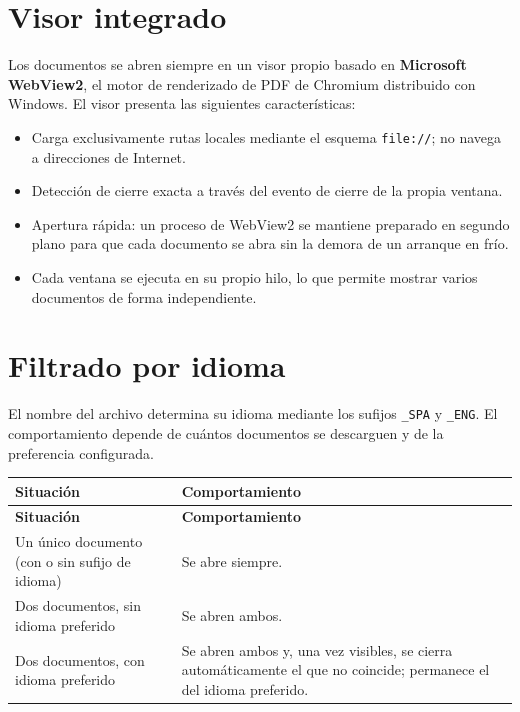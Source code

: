 \documentclass[11pt,a4paper]{article}
\begin{document}
\section{Visor integrado}
Los documentos se abren siempre en un visor propio basado en \textbf{Microsoft
WebView2}, el motor de renderizado de PDF de Chromium distribuido con Windows.
El visor presenta las siguientes características:

\begin{itemize}[leftmargin=1.4em,itemsep=2pt]
  \item Carga exclusivamente rutas locales mediante el esquema \texttt{file://};
        no navega a direcciones de Internet.
  \item Detección de cierre exacta a través del evento de cierre de la propia
        ventana.
  \item Apertura rápida: un proceso de WebView2 se mantiene preparado en segundo
        plano para que cada documento se abra sin la demora de un arranque en
        frío.
  \item Cada ventana se ejecuta en su propio hilo, lo que permite mostrar varios
        documentos de forma independiente.
\end{itemize}

\section{Filtrado por idioma}
El nombre del archivo determina su idioma mediante los sufijos \texttt{\_SPA} y
\texttt{\_ENG}. El comportamiento depende de cuántos documentos se descarguen y
de la preferencia configurada.

\begin{xltabular}{\textwidth}{@{} L L @{}}
\toprule
\textbf{Situación} & \textbf{Comportamiento} \\
\midrule
\endfirsthead
\toprule
\textbf{Situación} & \textbf{Comportamiento} \\
\midrule
\endhead
\bottomrule
\endfoot
Un único documento (con o sin sufijo de idioma) & Se abre siempre. \\
Dos documentos, sin idioma preferido & Se abren ambos. \\
Dos documentos, con idioma preferido & Se abren ambos y, una vez visibles, se cierra automáticamente el que no coincide; permanece el del idioma preferido. \\
\bottomrule
\end{xltabular}
\end{document}
